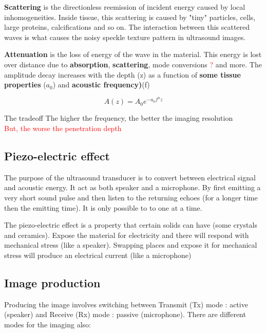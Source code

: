 	\textbf{Scattering} is the directionless reemission of incident energy caused by local inhomogeneities. Inside tissue, this scattering is caused by "tiny" particles, cells, large proteins, calcifications and so on. The interaction between this scattered waves is what causes the noisy speckle texture pattern in ultrasound images. 

	\textbf{Attenuation} is the loss of energy of the wave in the material. This energy is lost over distance due to \textbf{absorption}, \textbf{scattering}, mode conversions \textcolor{red}{?} and more. The amplitude decay increases with the depth (z) as a function of \textbf{some tissue properties} ($a_0$) and \textbf{acoustic frequency)}(f) 


		\begin{equation}
		A(z) = A_0 e^{-a_0 f^{n}z}
		\end{equation}

		\begin{wbox}{The tradeoff}
			\textcolor{OliveGreen}{The higher the frequency, the better the imaging resolution } \\
			\textcolor{red}{But, the worse the penetration depth} 
		\end{wbox}
	
	\subsection*{Piezo-electric effect}
	The purpose of the ultrasound transducer is to convert between electrical signal and acoustic energy. It act as both speaker and a microphone. By first emitting a very short sound pulse and then listen to the returning echoes (for a longer time then the emitting time). It is only possible to to one at a time. 

	The piezo-electric effect is a property that certain solids can have (some crystals and ceramics). Expose the material for electricity and there will respond with mechanical stress (like a speaker). Swapping places and expose it for mechanical stress will produce an electrical current (like a microphone)

	\subsection*{Image production}
	Producing the image involves switching between Transmit (Tx) mode : active (speaker) and Receive (Rx) mode : passive (microphone). There are different modes for the imaging also:

